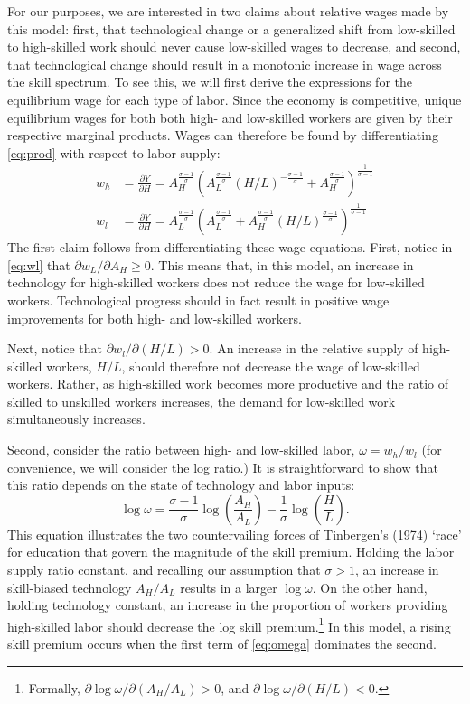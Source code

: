 For our purposes, we are interested in two claims about relative wages made by this model: first, that technological change or a generalized shift from low-skilled to high-skilled work should never cause low-skilled wages to decrease, and second, that technological change should result in a monotonic increase in wage across the skill spectrum. To see this, we will first derive the expressions for the equilibrium wage for each type of labor. Since the economy is competitive, unique equilibrium wages for both both high- and low-skilled workers are given by their respective marginal products. Wages can therefore be found by differentiating \eqref{eq:prod} with respect to labor supply:
\begin{align}
w_h &= \frac{\partial Y}{\partial H} 
     = A_H^\frac{\sigma-1}{\sigma}\left(
              A_L^{\frac{\sigma-1}{\sigma}} (H/L)^{-\frac{\sigma-1}{\sigma}} + A_H^{\frac{\sigma-1}{\sigma}}
        \right)^{\frac{1}{\sigma - 1}} \label{eq:wh} \\
w_l &= \frac{\partial Y}{\partial H} 
     = A_L^\frac{\sigma-1}{\sigma}\left(
              A_L^{\frac{\sigma-1}{\sigma}} + A_H^{\frac{\sigma-1}{\sigma}}(H/L)^{\frac{\sigma-1}{\sigma}}
        \right)^{\frac{1}{\sigma - 1}} \label{eq:wl}
\end{align}
The first claim follows from differentiating these wage equations. First, notice in \eqref{eq:wl} that $\partial w_L/\partial A_H \geq 0$. This means that, in this model, an increase in technology for high-skilled workers does not reduce the wage for low-skilled workers. Technological progress should in fact result in positive wage improvements for both high- and low-skilled workers. 

Next, notice that $\partial w_l/\partial(H/L)>0$. An increase in the relative supply of high-skilled workers, $H/L$, should therefore not decrease the wage of low-skilled workers. Rather, as high-skilled work becomes more productive and the ratio of skilled to unskilled workers increases, the demand for low-skilled work simultaneously increases. 

Second, consider the ratio between high- and low-skilled labor, $\omega=w_h/w_l$ (for convenience, we will consider the log ratio.) It is straightforward to show that this ratio depends on the state of technology and labor inputs:
\begin{equation}\label{eq:omega}
\log \omega = \frac{\sigma-1}{\sigma}\log\left(\frac{A_H}{A_L}\right) - \frac{1}{\sigma}\log\left(\frac{H}{L}\right).
\end{equation}
This equation illustrates the two countervailing forces of Tinbergen's (1974) `race' for education that govern the magnitude of the skill premium. Holding the labor supply ratio constant, and recalling our assumption that $\sigma >1$, an increase in skill-biased technology $A_H/A_L$ results in a larger $\log\omega$. On the other hand, holding technology constant, an increase in the proportion of workers providing high-skilled labor should decrease the log skill premium.\footnote{Formally, $\partial \log\omega / \partial(A_H/A_L) > 0$, and 
$\partial \log\omega / \partial(H/L) < 0$.} In this model, a rising skill premium occurs when the first term of \eqref{eq:omega}  dominates the second.

